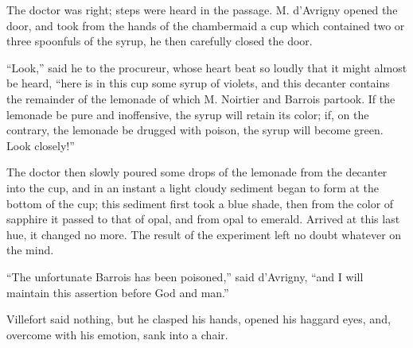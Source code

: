 The doctor was right; steps were heard in the passage. M. d’Avrigny
opened the door, and took from the hands of the chambermaid a cup which
contained two or three spoonfuls of the syrup, he then carefully closed
the door.

“Look,” said he to the procureur, whose heart beat so loudly that it
might almost be heard, “here is in this cup some syrup of violets, and
this decanter contains the remainder of the lemonade of which M.
Noirtier and Barrois partook. If the lemonade be pure and inoffensive,
the syrup will retain its color; if, on the contrary, the lemonade be
drugged with poison, the syrup will become green. Look closely!”

The doctor then slowly poured some drops of the lemonade from the
decanter into the cup, and in an instant a light cloudy sediment began
to form at the bottom of the cup; this sediment first took a blue
shade, then from the color of sapphire it passed to that of opal, and
from opal to emerald. Arrived at this last hue, it changed no more. The
result of the experiment left no doubt whatever on the mind.

“The unfortunate Barrois has been poisoned,” said d’Avrigny, “and I
will maintain this assertion before God and man.”

Villefort said nothing, but he clasped his hands, opened his haggard
eyes, and, overcome with his emotion, sank into a chair.
